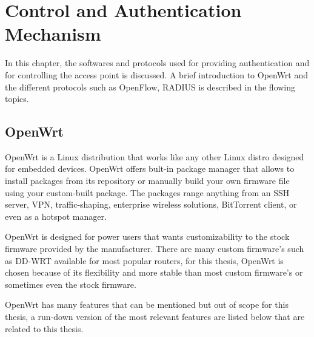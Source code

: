
\chapter{Control and Authentication Mechanism}\label{ch:control_and_authentication}
\sffamily{}

In this chapter, the softwares and protocols used for providing authentication and for controlling the access point is discussed. A brief introduction to OpenWrt and the different protocols such as OpenFlow, RADIUS is described in the flowing topics.
\section{OpenWrt \cite{WhatIsOpenWrt}} \label{OpenWrt}

OpenWrt is a Linux distribution that works like any other Linux distro designed for embedded devices. OpenWrt offers bult-in package manager that allows to install packages from its repository or manually build your own firmware file using your custom-built package. The packages range anything from an SSH server, VPN, traffic-shaping, enterprise wireless solutions, BitTorrent client, or even as a hotspot manager.

OpenWrt is designed for power users that wants customizability to the stock firmware provided by the manufacturer. There are many custom firmware’s such as DD-WRT available for most popular routers, for this thesis, OpenWrt is chosen because of its flexibility and more stable than most custom firmware’s or sometimes even the stock firmware.

OpenWrt has many features that can be mentioned but out of scope for this thesis, a run-down version of the most relevant features are listed below that are related to this thesis.

